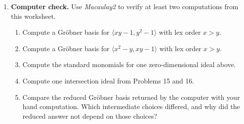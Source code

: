 \documentclass[12pt,reqno]{amsart}
\begin{document}
\begin{enumerate}[leftmargin=*, resume=problems]
\item \textbf{Computer check.} Use \textit{Macaulay2} to verify at least two computations from this worksheet.
\begin{enumerate}[label=(\alph*),ref=\theenumi\alph*]
    \item Compute a Gr\"obner basis for $\langle xy-1,y^2-1\rangle$ with lex order $x>y$.
    
    \item Compute a Gr\"obner basis for $\langle x^2-y,xy-1\rangle$ with lex order $x>y$.
    
    \item Compute the standard monomials for one zero-dimensional ideal above.
    
    \item Compute one intersection ideal from Problems 15 and 16.
    
    \item Compare the reduced Gr\"obner basis returned by the computer with your hand computation. Which intermediate choices differed, and why did the reduced answer not depend on those choices?
\end{enumerate}

\end{enumerate}
\end{document}
